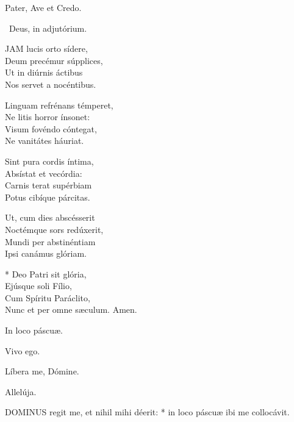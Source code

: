 

Pater, Ave et Credo.

\V\ Deus, in adjutórium.


\lettrine[lines=2]{J}{AM} lucis orto sídere,\\
Deum precémur súpplices,\\
Ut in diúrnis áctibus\\
Nos servet a nocéntibus.

Linguam refrénans témperet,\\
Ne litis horror ínsonet:\\
Visum fovéndo cóntegat,\\
Ne vanitátes háuriat.

Sint pura cordis íntima,\\
Absístat et vecórdia:\\
Carnis terat supérbiam\\
Potus cibíque párcitas.

Ut, cum dies abscésserit\\
Noctémque sors redúxerit,\\
Mundi per abstinéntiam\\
Ipsi canámus glóriam.

* Deo Patri sit glória,\\
Ejúsque soli Fílio,\\
Cum Spíritu Paráclito,\\
Nunc et per omne sæculum. Amen.

  In loco páscuæ.



 Vivo ego.


 Líbera me, Dómine.

  Allelúja.


\lettrine[lines=2]{D}{OMINUS} regit me, et nihil mihi déerit: * in loco páscuæ ibi me collocávit.


